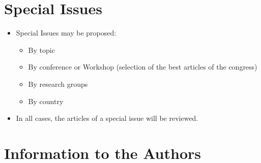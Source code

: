 \documentclass[twoside,a4paper,11pt]{article}
\begin{document}
\section{Special Issues}

\begin{itemize}

\item Special Issues may be proposed:

\begin{itemize}

\item By topic
\item By conference or Workshop (selection of the best articles of the congress)
\item By research groups
\item By country
\end{itemize}

\item In all cases, the articles of a special issue will be reviewed.

\end{itemize}

\section{Information to the Authors}
\end{document}
